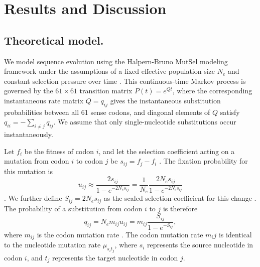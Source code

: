 \documentclass[11pt]{article}
\begin{document}
		
\section*{Results and Discussion}
		
		
\subsection*{Theoretical model.}

We model sequence evolution using the Halpern-Bruno MutSel modeling framework under the assumptions of a fixed effective population size $N_e$ and constant selection pressure over time \cite{HalpernBruno1998,YangNielsen2008,Tamurietal2012,Thorne2012}. This continuous-time Markov process is governed by the $61 \times 61$ transition matrix $P(t) = e^{Qt}$, where the corresponding instantaneous rate matrix $Q = q_{ij}$ gives the instantaneous substitution probabilities between all 61 sense codons, and diagonal elements of $Q$ satisfy $q_{ii} = -\sum_{i \neq j} q_{ij}$. We assume that only single-nucleotide substitutions occur instantaneously.

Let $f_i$ be the fitness of codon $i$, and let the selection coefficient acting on a mutation from codon $i$ to codon $j$ be $s_{ij} = f_j - f_i$ \cite{SellaHirsh2005,YangNielsen2008}. The fixation probability for this mutation is 
\begin{equation}\label{eq:u_ij}
u_{ij} \approx \frac{2s_{ij}}{1 - e^{-2N_es_{ij}}} = \frac{1}{N_e}\frac{2N_es_{ij}}{1 - e^{-2N_es_{ij}}}
\end{equation} \cite{Kimura1962,HalpernBruno1998,YangNielsen2008}. We further define $S_{ij} = 2N_es_{ij}$ as the scaled selection coefficient for this change \cite{YangNielsen2008}. The probability of a substitution from codon $i$ to $j$ is therefore
\begin{equation}\label{eq:q_ij}
q_{ij} = N_em_{ij}u_{ij} = m_{ij}\frac{S_{ij}}{1 - e^{-S_{ij}}} , 
\end{equation} where $m_{ij}$ is the codon mutation rate \cite{HalpernBruno1998,SellaHirsh2005}. The codon mutation rate $m_ij$ is identical to the nucleotide mutation rate $\mu_{s_it_j}$, where $s_i$ represents the source nucleotide in codon $i$, and $t_j$ represents the target nucleotide in codon $j$.
\end{document}
